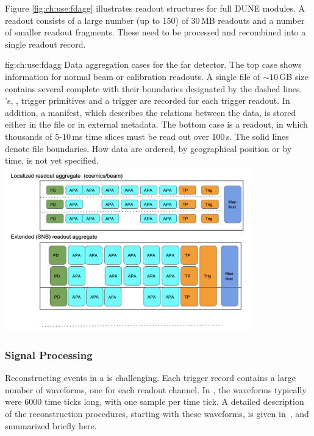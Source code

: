 \documentclass[../main-v1.tex]{subfiles}
\begin{document}
Figure \ref{fig:ch:use:fdagg} illustrates  readout structures for full DUNE  modules.  A readout consists of a large number (up to 150) of   30\,MB  readouts and a number of smaller readout fragments.  These need to be processed and  recombined into a single readout record. 

\begin{dunefigure}
{fig:ch:use:fdagg}
{Data aggregation cases for the far detector. The top case shows information for normal beam or calibration readouts. A single file of $\sim 10$\,GB size contains several complete  with their boundaries designated by the dashed lines.   's, ,  trigger primitives and a trigger  are recorded for each trigger readout.  In addition, a manifest, which describes the relations between the data, is stored either in the file or in external metadata.  The bottom case is a  readout, in which thousands of 5-10\,ms time slices must be read out over 100\,s.  The solid lines denote file boundaries. How data are ordered, by geographical position or by time,    is not  yet specified.}
\includegraphics[width=0.8\textwidth]{graphics/IntroFigures/DataAggregation.png}
\end{dunefigure}

\subsubsection{Signal Processing }

Reconstructing events in a  is challenging.  Each trigger record contains a large number of waveforms, one for each readout channel.  In , the waveforms typically were 6000 time ticks long, with one  sample per time tick.  A detailed description of the reconstruction procedures, starting with these waveforms, is given in~\cite{Abi:2020mwi}, and summarized briefly here.
\end{document}
